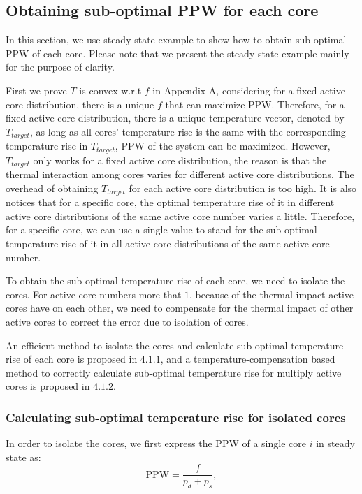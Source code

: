 
\subsection{Obtaining sub-optimal PPW for each core}
In this section, we use steady state example to show how to obtain sub-optimal PPW of each core. Please note that we present the steady state example mainly for the purpose of clarity.

First we prove $T$ is convex w.r.t $f$ in Appendix A, considering for a fixed active core distribution, there is a unique $f$ that can maximize PPW. Therefore, for a fixed active core distribution, there is a unique temperature vector, denoted by $T_{target}$, as long as all cores' temperature rise is the same with the corresponding temperature rise in $T_{target}$, PPW of the system can be maximized. However, $T_{target}$ only works for a fixed active core distribution, the reason is that the thermal interaction among cores varies for different active core distributions. The overhead of obtaining $T_{target}$ for each active core distribution is too high. It is also notices that for a specific core, the optimal temperature rise of it in different active core distributions of the same active core number varies a little. 
Therefore, for a specific core, we can use a single value to stand for the sub-optimal temperature rise of it in all active core distributions of the same active core number.

To obtain the sub-optimal temperature rise of each core, we need to isolate the cores. For active core numbers more that $1$, because of the thermal impact active cores have on each other, we need to compensate for the thermal impact of other active cores to correct the error due to isolation of cores.

An efficient method to isolate the cores and calculate sub-optimal temperature rise of each core is proposed in $4.1.1$, and a temperature-compensation based method to correctly calculate sub-optimal temperature rise for multiply active cores is proposed in $4.1.2$.

\subsubsection{Calculating sub-optimal temperature rise for isolated cores}
In order to isolate the cores, we first express the PPW of a single core $i$ in steady state as:
\begin{equation}\label{eq:min_ppw}
\text{PPW}=\frac{f}{p_{d}+p_{s}},
\end{equation}

